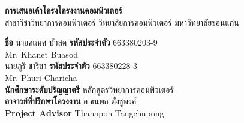 \begin{center}
{\fontsize{16}{20}\selectfont\bfseries การเสนอเค้าโครงโครงงานคอมพิวเตอร์}\\
{\fontsize{16}{20}\selectfont สาขาวิชาวิทยาการคอมพิวเตอร์  วิทยาลัยการคอมพิวเตอร์  มหาวิทยาลัยขอนแก่น}
\end{center}

{\fontsize{14}{17}\selectfont
\noindent\textbf{ชื่อ} \quad นายคเณศ บัวสด \textbf{รหัสประจำตัว} 663380203-9\\
\hspace*{2.0cm} Mr. Khanet Buasod\\
\hspace*{2.0cm} นายภูริ ชาริชา \quad \textbf{รหัสประจำตัว} 663380228-3\\
\hspace*{2.0cm} Mr. Phuri Charicha\\
\textbf{นักศึกษาระดับปริญญาตรี} หลักสูตรวิทยาการคอมพิวเตอร์\\
\textbf{อาจารย์ที่ปรึกษาโครงงาน} อ.ธนพล ตั้งชูพงศ์\\
\textbf{Project Advisor} \hspace{1.5cm} Thanapon Tangchupong
}

\pagestyle{empty}
